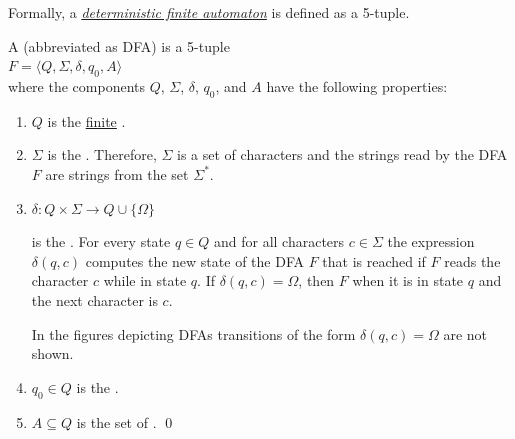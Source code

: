 \noindent
Formally, a \href{http://en.wikipedia.org/wiki/Finite-state_machine}{\emph{deterministic finite automaton}} 
is defined as a 5-tuple.
\begin{Definition}
A  (abbreviated as \textsc{DFA}) is a 5-tuple 
\\[0.2cm]
\hspace*{1.3cm}
$F = \langle Q, \Sigma, \delta, q_0, A\rangle$
\\[0.2cm]
where the components $Q$, $\Sigma$, $\delta$, $q_0$, and $A$ have the following properties:
\begin{enumerate}
\item $Q$ is the \underline{finite} .
\item $\Sigma$ is the \index{$\Sigma$}.  Therefore, $\Sigma$ is a
      set of characters and 
      the strings read by the \textsc{DFA} $F$ are strings from the set $\Sigma^*$.
\item $\delta: Q \times \Sigma \rightarrow Q \cup \{ \Omega \}$

      is the  .  For every state $q\in Q$ and for all
      characters $c \in \Sigma$ the expression $\delta(q,c)$ computes the new state of the \textsc{DFA} $F$
      that is reached if $F$ reads the character $c$ while in state $q$.
      If $\delta(q,c) = \Omega$, then $F$  when it is in state $q$ and the next character
      is $c$. 

      In the figures depicting \textsc{DFA}s transitions of the form $\delta(q, c) = \Omega$ 
      are not shown.
\item $q_0 \in Q$ is the . 
\item $A \subseteq Q$ is the set of . 
      \qed
\end{enumerate}
\end{Definition}

